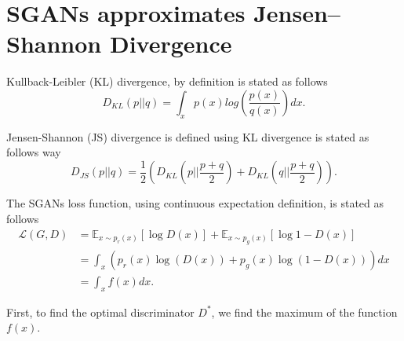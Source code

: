 \chapter{SGANs approximates Jensen–Shannon Divergence}
\label{apx:JSD}
Kullback-Leibler (KL) divergence, by definition is stated as follows
\begin{equation*}
  D_{KL}(p || q) = \int_xp(x)log(\frac{p(x)}{q(x)})dx. 
\end{equation*}

Jensen-Shannon (JS) divergence is defined using KL divergence is stated as follows
way
\begin{equation*}
D_{JS}(p || q) = \frac{1}{2}(D_{KL}(p || \frac{p+q}{2}) + D_{KL}(q || \frac{p+q}{2})).
\end{equation*}


The SGANs loss function, using continuous expectation definition, is stated as follows
\begin{equation*}
  \begin{split}
    \mathcal{L}(G, D) & =  \mathbb{E}_{x \sim p_r(x)}[\log{D(x)}] +  \mathbb{E}_{x \sim p_g(x)}[\log{1 - D(x)}] \\
    & = \int_x(p_r(x)\log{(D(x))} + p_g(x)\log{(1-D(x))})dx \\
    & = \int_xf(x)dx.
  \end{split}
\end{equation*}

First, to find the optimal discriminator $D^*$, we find the maximum of the
function $f(x)$.

